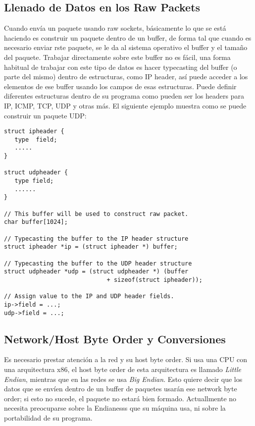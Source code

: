 \subsection{Llenado de Datos en los Raw Packets}

Cuando envía un paquete usando raw sockets, básicamente lo que se está haciendo es construir un paquete dentro de un buffer, de forma tal que cuando es necesario enviar rste paquete, se le da al sistema operativo el buffer y el tamaño del paquete. 
Trabajar directamente sobre este buffer no es fácil, una forma habitual de trabajar con este tipo de datos es hacer typecasting del buffer (o parte del mismo) dentro de estructuras, como IP header, así puede acceder a los elementos de ese buffer usando los campos de esas estructuras.
Puede definir diferentes estructuras dentro de su programa como pueden ser los headers para IP, ICMP, TCP, UDP y otras más. El siguiente ejemplo muestra como se puede construir un paquete UDP:

\begin{lstlisting}
struct ipheader {
   type  field;
   .....
}

struct udpheader {
   type field;
   ......
}

// This buffer will be used to construct raw packet.
char buffer[1024];

// Typecasting the buffer to the IP header structure
struct ipheader *ip = (struct ipheader *) buffer;

// Typecasting the buffer to the UDP header structure
struct udpheader *udp = (struct udpheader *) (buffer
                             + sizeof(struct ipheader));

// Assign value to the IP and UDP header fields.
ip->field = ...;
udp->field = ...;
\end{lstlisting}



\subsection{Network/Host Byte Order y Conversiones}

Es necesario prestar atención a la red y su host byte order. Si usa una CPU con una arquitectura x86, el host byte order de esta arquitectura es llamado {\em Little Endian}, mientras que en las redes se usa {\em Big Endian}. Esto quiere decir que los datos que se envíen dentro de un buffer de paquetes usarán ese network byte order; si esto no sucede, el paquete no estará bien formado. Actuallmente no necesita preocuparse sobre la Endianesss que su máquina usa, ni sobre la portabilidad de su programa.

